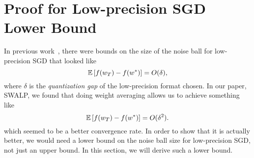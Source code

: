 
\section{Proof for Low-precision SGD Lower Bound}\label{sec:thm-lowerbound}
In previous work~\cite{training-quantized-network-deeper-understanding}, there were bounds on the size of the noise ball for low-precision SGD that looked like
\[
  \mathbb{E}\left[ f(w_T) - f(w^*) \right] = O(\delta),
\]
where $\delta$ is the \emph{quantization gap} of the low-precision format chosen.
In our paper, SWALP, we found that doing weight averaging allows us to achieve something like
\[
  \mathbb{E}\left[ f(w_T) - f(w^*) \right] = O(\delta^2).
\] 
which seemed to be a better convergence rate.
In order to show that it is actually better, we would need a lower bound on the noise ball size for low-precision SGD, not just an upper bound.
In this section, we will derive such a lower bound.

